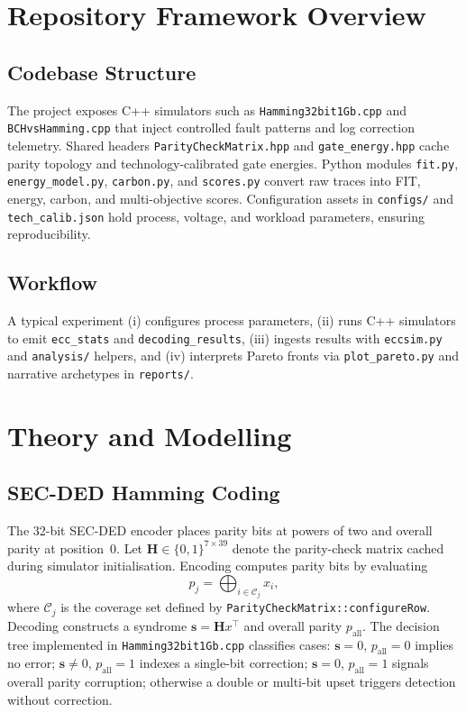 \documentclass[conference]{IEEEtran}
\begin{document}
\section{Repository Framework Overview}
\subsection{Codebase Structure}
The project exposes C++ simulators such as \texttt{Hamming32bit1Gb.cpp} and \texttt{BCHvsHamming.cpp} that inject controlled fault patterns and log correction telemetry.
Shared headers \texttt{ParityCheckMatrix.hpp} and \texttt{gate\_energy.hpp} cache parity topology and technology-calibrated gate energies.
Python modules \texttt{fit.py}, \texttt{energy\_model.py}, \texttt{carbon.py}, and \texttt{scores.py} convert raw traces into FIT, energy, carbon, and multi-objective scores.
Configuration assets in \texttt{configs/} and \texttt{tech\_calib.json} hold process, voltage, and workload parameters, ensuring reproducibility.
\subsection{Workflow}
A typical experiment (i) configures process parameters, (ii) runs C++ simulators to emit \texttt{ecc\_stats} and \texttt{decoding\_results}, (iii) ingests results with \texttt{eccsim.py} and \texttt{analysis/} helpers, and (iv) interprets Pareto fronts via \texttt{plot\_pareto.py} and narrative archetypes in \texttt{reports/}.
\section{Theory and Modelling}
\subsection{SEC-DED Hamming Coding}
The 32-bit SEC-DED encoder places parity bits at powers of two and overall parity at position~0.
Let $\mathbf{H}\in\{0,1\}^{7\times39}$ denote the parity-check matrix cached during simulator initialisation.
Encoding computes parity bits by evaluating
\begin{equation}
    p_{j} = \bigoplus_{i \in \mathcal{C}_{j}} x_{i},
\end{equation}
where $\mathcal{C}_{j}$ is the coverage set defined by \texttt{ParityCheckMatrix::configureRow}.
Decoding constructs a syndrome $\mathbf{s}=\mathbf{H}x^{\top}$ and overall parity $p_{\text{all}}$.
The decision tree implemented in \texttt{Hamming32bit1Gb.cpp} classifies cases: $\mathbf{s}=0$, $p_{\text{all}}=0$ implies no error; $\mathbf{s}\neq0$, $p_{\text{all}}=1$ indexes a single-bit correction; $\mathbf{s}=0$, $p_{\text{all}}=1$ signals overall parity corruption; otherwise a double or multi-bit upset triggers detection without correction.
\end{document}

